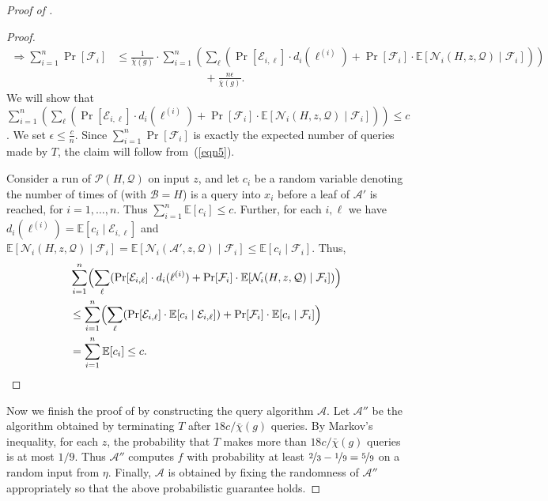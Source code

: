 \documentclass{toc}
\newcommand{\dr}{\nicefrac}
\newcommand{\cA}{\mathcal{A}}
\newcommand{\clB}{\mathcal{B}}
\newcommand{\clE}{\mathcal{E}}
\newcommand{\clQ}{\mathcal{Q}}
\newcommand{\clP}{\mathcal{P}}
\newcommand{\clN}{\mathcal{N}}
\newcommand{\E}{\mathbb{E}}
\begin{document}
\begin{proof}[Proof of {}]
\begin{proof}
\begin{align}
\Rightarrow \sum_{i=1}^n \Pr[\mathcal{F}_i] &\leq  \frac{1}{\bar \chi(g)} \cdot \sum_{i=1}^n\left(\sum_{\ell}(\Pr[\clE_{i,\ell}]\cdot d_i(\ell^{(i)})+\Pr[\mathcal{F}_i]\cdot \E[\clN_i(H,z,\clQ) \mid \mathcal{F}_i])\right)\nonumber\\
&\qquad \qquad \qquad \qquad+\frac{n\epsilon}{\bar\chi(g)}.
\label{eqn5}
\end{align}
We will show that $\sum_{i=1}^n\left(\sum_{\ell}(\Pr[\clE_{i,\ell}]\cdot d_i(\ell^{(i)})+\Pr[\mathcal{F}_i]\cdot \E[\clN_i(H,z,\clQ) \mid \mathcal{F}_i])\right) \leq c$. We set $\epsilon \leq \frac{c}{n}$. Since $\sum_{i=1}^n \Pr[\mathcal{F}_i]$ is exactly the expected number of queries made by $T$, the claim will follow from~(\ref{eqn5}). 

Consider a run of $\clP(H,\clQ)$ on input $z$, and let $c_i$ be a random variable denoting the number of times  of  (with $\clB = H$) is a query into $x_i$ before a leaf of $\cA'$ is reached, for $i=1, \ldots, n$.  
Thus $\sum_{i=1}^n \E[c_i] \leq c$.
Further, for each $i,\ell$ we have $d_i(\ell^{(i)}) = \E[c_i \mid \clE_{i,\ell}]$ and $\E[\clN_i(H,z,\clQ) \mid \mathcal{F}_i] =\E[\clN_i(\cA',z,\clQ) \mid \mathcal{F}_i] \leq \E[c_i \mid \mathcal{F}_i]$. Thus,
\begin{align*}
&\sum_{i=1}^n\Bigl(\sum_{\ell}(\Pr[\clE_{i,\ell}]\cdot d_i(\ell^{(i)})+\Pr[\mathcal{F}_i]\cdot \E[\clN_i(H,z,\clQ) \mid \mathcal{F}_i])\Bigr) \\
&\leq \sum_{i=1}^n \Bigl(\sum_{\ell}(\Pr[\clE_{i,\ell}] \cdot \E[c_i \mid \clE_{i,\ell}]) +\Pr[\mathcal{F}_i]\cdot\E[c_i \mid \mathcal{F}_i]\Bigr) \\
&= \sum_{i=1}^n \E[c_i ] \leq c.
\end{align*}
\end{proof}

Now we finish the proof of  by constructing the query algorithm $\cA$. Let $\cA''$ be the algorithm obtained by terminating $T$ after $18c/\bar\chi(g)$ queries. By Markov's inequality, for each $z$, the probability that $T$ makes more than $18c/\bar\chi(g)$ queries is at most $1/9$. Thus $\cA''$ computes $f$ with probability at least $\dr23 - \dr19=\dr59$ on a random input from $\eta$. Finally, $\cA$ is obtained by fixing the randomness of $\cA''$ appropriately so that the above probabilistic guarantee holds.
\end{proof}
%
\end{document}
